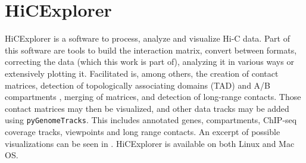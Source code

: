 %
%
%
%
%
%




\newpage
\section{HiCExplorer}\label{sec:hicexplorer}

HiCExplorer \cite{wolff2018galaxy} is a software to process, analyze and
visualize Hi-C data. Part of this software are tools to build the interaction
matrix, convert between formats, correcting the data (which this work is
part of), analyzing it in various ways or extensively plotting it.
Facilitated is, among others, the creation of contact matrices, detection of
topologically associating domains (TAD) \cite{ulianov2016active} and A/B
compartments \cite{lieberman2009comprehensive}, merging of matrices, and
detection of long-range contacts\footnotemark. Those contact matrices may then
be visualized, and other data tracks may be added using \verb|pyGenomeTracks|.
This includes annotated genes, compartments, ChIP-seq coverage tracks,
viewpoints and long range contacts\footnotemark[\value{footnote}]. An excerpt
of possible visualizations can be seen in . HiCExplorer
is available on both Linux and Mac OS.

